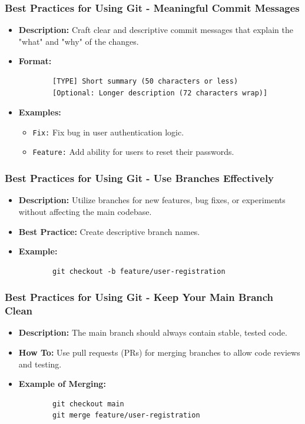 \documentclass{beamer}
\begin{document}
\begin{frame}[fragile]
    \frametitle{Best Practices for Using Git - Meaningful Commit Messages}
    \begin{itemize}
        \item \textbf{Description:} Craft clear and descriptive commit messages that explain the "what" and "why" of the changes.
        \item \textbf{Format:}
        \begin{lstlisting}
        [TYPE] Short summary (50 characters or less)
        [Optional: Longer description (72 characters wrap)]
        \end{lstlisting}
        \item \textbf{Examples:}
        \begin{itemize}
            \item \texttt{Fix:} Fix bug in user authentication logic.
            \item \texttt{Feature:} Add ability for users to reset their passwords.
        \end{itemize}
    \end{itemize}
\end{frame}

\begin{frame}[fragile]
    \frametitle{Best Practices for Using Git - Use Branches Effectively}
    \begin{itemize}
        \item \textbf{Description:} Utilize branches for new features, bug fixes, or experiments without affecting the main codebase.
        \item \textbf{Best Practice:} Create descriptive branch names.
        \item \textbf{Example:}
        \begin{lstlisting}
        git checkout -b feature/user-registration
        \end{lstlisting}
    \end{itemize}
\end{frame}

\begin{frame}[fragile]
    \frametitle{Best Practices for Using Git - Keep Your Main Branch Clean}
    \begin{itemize}
        \item \textbf{Description:} The main branch should always contain stable, tested code.
        \item \textbf{How To:} Use pull requests (PRs) for merging branches to allow code reviews and testing.
        \item \textbf{Example of Merging:}
        \begin{lstlisting}
        git checkout main
        git merge feature/user-registration
        \end{lstlisting}
    \end{itemize}
\end{frame}
\end{document}
